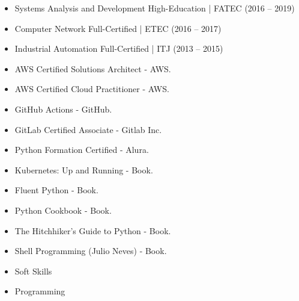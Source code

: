 
\begin{itemize}
    \item Systems Analysis and Development \newline High-Education | FATEC (2016 -- 2019)
    \item Computer Network \newline Full-Certified | ETEC (2016 -- 2017)
    \item Industrial Automation \newline Full-Certified | ITJ (2013 -- 2015)
\end{itemize}


\begin{itemize}
    \item AWS Certified Solutions Architect - AWS.
    \item AWS Certified Cloud Practitioner - AWS.
    \item GitHub Actions - GitHub.
    \item GitLab Certified Associate - Gitlab Inc.
    \item Python Formation Certified - Alura.
    \item Kubernetes: Up and Running - Book.
    \item Fluent Python - Book.
    \item Python Cookbook - Book.
    \item The Hitchhiker's Guide to Python - Book.
    \item Shell Programming (Julio Neves) - Book.
\end{itemize}


\begin{itemize}
    \item Soft Skills
\end{itemize}


\divider

\begin{itemize}
    \item Programming
\end{itemize}


\divider

